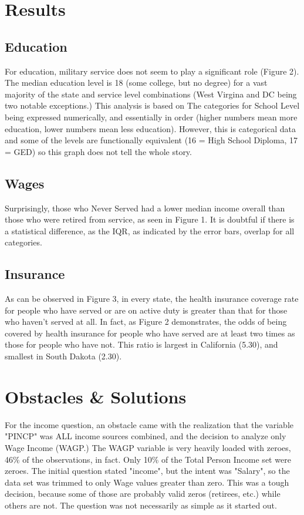 \documentclass{article}
\begin{document}
\section{Results}
\subsection{Education}
For education, military service does not seem to play a significant role (Figure 2). The median education level is 18 (some college, but no degree) for a vast majority of the state and service level combinations (West Virgina and DC being two notable exceptions.) This analysis is based on The categories for School Level being expressed numerically, and essentially in order (higher numbers mean more education, lower numbers mean less education). However, this is categorical data and some of the levels are functionally equivalent (16 = High School Diploma, 17 = GED) so this graph does not tell the whole story.

\subsection{Wages}
Surprisingly, those who Never Served had a lower median income overall than those who were retired from service, as seen in Figure 1. It is doubtful if there is a statistical difference, as the IQR, as indicated by the error bars, overlap for all categories. 






\subsection{Insurance}
As can be observed in Figure 3, in every state, the health insurance coverage rate for people who have served or are on active duty is greater than that for those who haven't served at all. In fact, as Figure 2 demonstrates, the odds of being covered by health insurance for people who have served are at least two times as those for people who have not. This ratio is largest in California (5.30), and smallest in South Dakota (2.30).



\section{Obstacles \& Solutions}
For the income question, an obstacle came with the realization that the variable "PINCP" was ALL income sources combined, and the decision to analyze only Wage Income (WAGP.) The WAGP variable is very heavily loaded with zeroes, 46\% of the observations, in fact. Only 10\% of the Total Person Income set were zeroes. The initial question stated "income", but the intent was "Salary", so the data set was trimmed to only Wage values greater than zero. This was a tough decision, because some of those are probably valid zeros (retirees, etc.) while others are not. The question was not necessarily as simple as it started out.\\
\end{document}
